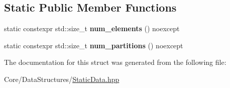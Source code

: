 \subsection*{Static Public Member Functions}
\begin{DoxyCompactItemize}
\item 
\mbox{\label{structsequoia_1_1data__structures_1_1impl_1_1static__contiguous__data_1_1data_a9016baeeb7206b65d0fa95f91b37dd17}} 
static constexpr std\+::size\+\_\+t {\bfseries num\+\_\+elements} () noexcept
\item 
\mbox{\label{structsequoia_1_1data__structures_1_1impl_1_1static__contiguous__data_1_1data_ab57db9509ce960b474e0877bbe3be6a4}} 
static constexpr std\+::size\+\_\+t {\bfseries num\+\_\+partitions} () noexcept
\end{DoxyCompactItemize}


The documentation for this struct was generated from the following file\+:\begin{DoxyCompactItemize}
\item 
Core/\+Data\+Structures/\mbox{\hyperlink{_static_data_8hpp}{Static\+Data.\+hpp}}\end{DoxyCompactItemize}
